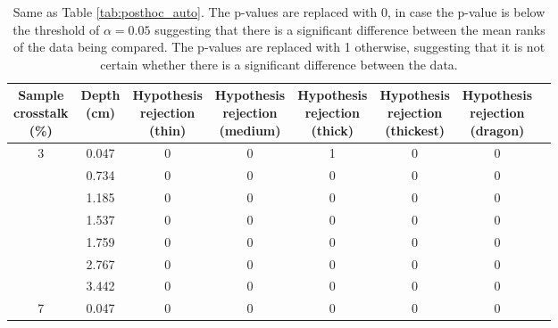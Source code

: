 \begin{table}[H]
  \begin{center}
    \caption{Same as Table \ref{tab:posthoc_auto}. The p-values are replaced with 0, in case the p-value is below the threshold of $\alpha = 0.05$ suggesting that there is a significant difference between the mean ranks of the data being compared. The p-values are replaced with 1 otherwise, suggesting that it is not certain whether there is a significant difference between the data.}
    \label{tab:posthoc_auto_null}
    \begin{tabular}{cccccccc}
      \toprule
      \specialcell{Sample\\crosstalk\\(\%)} & \specialcell{Depth \\(cm)} & \specialcell{Hypothesis\\rejection \\(thin)} & \specialcell{Hypothesis\\rejection \\(medium)} & \specialcell{Hypothesis\\rejection \\(thick)} & \specialcell{Hypothesis\\rejection \\(thickest)} & \specialcell{Hypothesis\\rejection \\(dragon)}\\
      \midrule
   3      &       0.047      &       0      &       0      &       1      &       0      &       0 \\
          &       0.734      &       0      &       0      &       0      &       0      &       0 \\
          &       1.185      &       0      &       0      &       0      &       0      &       0 \\
          &       1.537      &       0      &       0      &       0      &       0      &       0 \\
          &       1.759      &       0      &       0      &       0      &       0      &       0 \\
          &       2.767      &       0      &       0      &       0      &       0      &       0 \\
          &       3.442      &       0      &       0      &       0      &       0      &       0 \\
   7      &       0.047      &       0      &       0      &       0      &       0      &       0 \\

\end{tabular}
\end{center}
\end{table}
